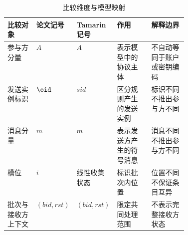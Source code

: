 \begin{table}[htbp]
  \centering
  \caption{比较维度与模型映射}
  \label{tab:identity-coordinate-map}
  \footnotesize
  \begin{tabularx}{\linewidth}{@{}L{0.16\linewidth}C{0.12\linewidth}C{0.14\linewidth}YY@{}}
    \toprule
    比较对象 & 论文记号 & Tamarin记号 & 作用 & 解释边界 \\
    \midrule
    参与方分量 & $A$ & $A$ & 表示模型中的协议主体 & 不自动等同于账户或密钥编码 \\
    发送实例标识 & $\oid$ & $\mathit{sid}$ & 区分规则产生的发送实例 & 标识不同不推出参与方不同 \\
    消息分量 & $m$ & $m$ & 表示发送方产生的符号消息 & 消息不同不推出参与方不同 \\
    槽位 & $i$ & 线性收集状态 & 标识批次内位置 & 位置不同不保证条目互异 \\
    批次与接收方上下文 & $(\mathit{bid},\mathit{rst})$ & $(\mathit{bid},\mathit{rst})$ & 限定共同处理范围 & 不表示完整接收方状态 \\
    \bottomrule
  \end{tabularx}
\end{table}

